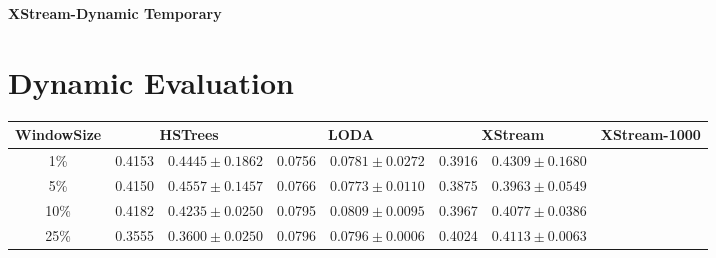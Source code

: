 \documentclass[11pt,onecolumn]{article}
\begin{document}
\textbf{\huge{XStream-Dynamic Temporary}}

\section{Dynamic Evaluation}

\begin{table}[!hbtp]
    \centering
    \begin{tabular}{|c|c|c|c|c|c|c|c|c|}
            \toprule
    WindowSize & \multicolumn{2}{|c|}{HSTrees} & \multicolumn{2}{|c|}{LODA} & \multicolumn{2}{|c|}{XStream} & \multicolumn{2}{|c|}{XStream-1000} \\	\hline
    1\%  & 0.4153 & $0.4445 \pm 0.1862$ & 0.0756 & $0.0781 \pm 0.0272$ & 0.3916 & $0.4309 \pm 0.1680$ & & \\	\hline
    5\% & 0.4150 & $0.4557 \pm 0.1457$ & 0.0766 & $0.0773 \pm 0.0110$ & 0.3875 & $0.3963 \pm 0.0549$ & &	\\	\hline
    10\% & 0.4182 & $0.4235 \pm 0.0250$ & 0.0795 & $0.0809 \pm 0.0095$ & 0.3967 & $0.4077 \pm 0.0386$ & & 	\\	\hline

    25\% & 0.3555 & $0.3600 \pm 0.0250$ & 0.0796 & $0.0796 \pm 0.0006$ & 0.4024 & $0.4113 \pm 0.0063$ & &	\\	\hline

    \bottomrule
    \end{tabular}
\end{table}





\printbibliography
\end{document}
